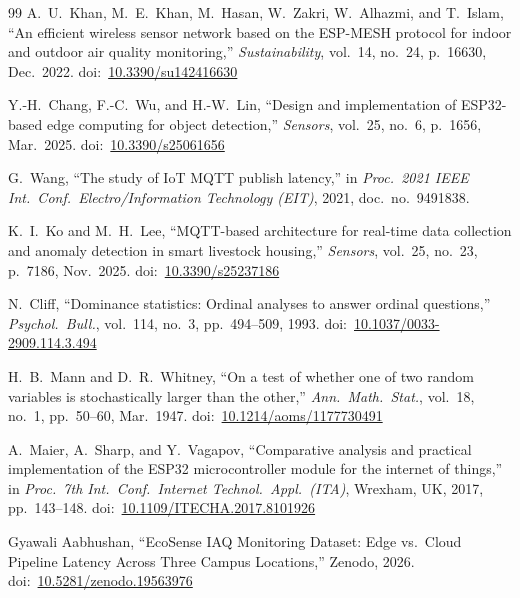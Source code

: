 \documentclass[12pt, a4paper]{article}
\begin{document}
\begin{thebibliography}{99}
A.~U.~Khan, M.~E.~Khan, M.~Hasan, W.~Zakri, W.~Alhazmi,
and T.~Islam,
``An efficient wireless sensor network based on the ESP-MESH protocol
for indoor and outdoor air quality monitoring,''
\textit{Sustainability}, vol.~14, no.~24, p.~16630, Dec.~2022.
doi:~\href{https://doi.org/10.3390/su142416630}
{10.3390/su142416630}

Y.-H.~Chang, F.-C.~Wu, and H.-W.~Lin,
``Design and implementation of ESP32-based edge computing for
object detection,''
\textit{Sensors}, vol.~25, no.~6, p.~1656, Mar.~2025.
doi:~\href{https://doi.org/10.3390/s25061656}{10.3390/s25061656}

G.~Wang,
``The study of IoT MQTT publish latency,''
in \textit{Proc.\ 2021 IEEE Int.\ Conf.\ Electro/Information
Technology (EIT)}, 2021, doc.~no.~9491838.

K.~I.~Ko and M.~H.~Lee,
``MQTT-based architecture for real-time data collection and anomaly
detection in smart livestock housing,''
\textit{Sensors}, vol.~25, no.~23, p.~7186, Nov.~2025.
doi:~\href{https://doi.org/10.3390/s25237186}{10.3390/s25237186}

N.~Cliff,
``Dominance statistics: Ordinal analyses to answer ordinal questions,''
\textit{Psychol.\ Bull.}, vol.~114, no.~3, pp.~494--509, 1993.
doi:~\href{https://doi.org/10.1037/0033-2909.114.3.494}
{10.1037/0033-2909.114.3.494}

H.~B.~Mann and D.~R.~Whitney,
``On a test of whether one of two random variables is stochastically
larger than the other,''
\textit{Ann.\ Math.\ Stat.}, vol.~18, no.~1,
pp.~50--60, Mar.~1947.
doi:~\href{https://doi.org/10.1214/aoms/1177730491}
{10.1214/aoms/1177730491}

A.~Maier, A.~Sharp, and Y.~Vagapov,
``Comparative analysis and practical implementation of the ESP32
microcontroller module for the internet of things,''
in \textit{Proc.\ 7th Int.\ Conf.\ Internet Technol.\ Appl.\ (ITA)},
Wrexham, UK, 2017, pp.~143--148.
doi:~\href{https://doi.org/10.1109/ITECHA.2017.8101926}
{10.1109/ITECHA.2017.8101926}

Gyawali Aabhushan,
``{EcoSense IAQ Monitoring Dataset: Edge vs.\ Cloud Pipeline Latency
Across Three Campus Locations},''
Zenodo, 2026.
doi:~\href{https://doi.org/10.5281/zenodo.19563976}
{10.5281/zenodo.19563976}

\end{thebibliography}
\end{document}

